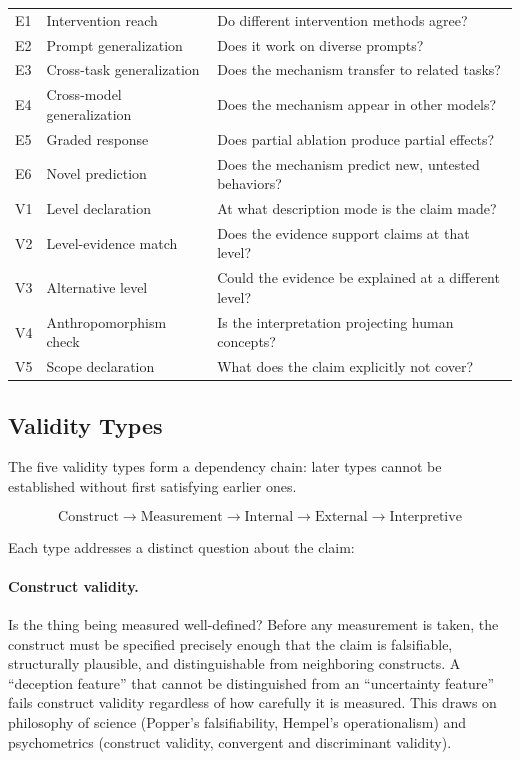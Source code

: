 \documentclass[10pt]{article}
\begin{document}
\begin{table}[H]
\begin{tabular}{@{}llp{8.5cm}@{}}
\midrule
E1 & Intervention reach & Do different intervention methods agree? \\
E2 & Prompt generalization & Does it work on diverse prompts? \\
E3 & Cross-task generalization & Does the mechanism transfer to related tasks? \\
E4 & Cross-model generalization & Does the mechanism appear in other models? \\
E5 & Graded response & Does partial ablation produce partial effects? \\
E6 & Novel prediction & Does the mechanism predict new, untested behaviors? \\
\midrule
V1 & Level declaration & At what description mode is the claim made? \\
V2 & Level-evidence match & Does the evidence support claims at that level? \\
V3 & Alternative level & Could the evidence be explained at a different level? \\
V4 & Anthropomorphism check & Is the interpretation projecting human concepts? \\
V5 & Scope declaration & What does the claim explicitly not cover? \\
\bottomrule
\end{tabular}
\end{table}
\endgroup

\subsection{Validity Types}
\label{sec:validity-types}

The five validity types form a dependency chain: later types cannot be established without first satisfying earlier ones.

\begin{equation}
\text{Construct} \rightarrow \text{Measurement} \rightarrow \text{Internal} \rightarrow \text{External} \rightarrow \text{Interpretive}
\label{eq:dependency}
\end{equation}

Each type addresses a distinct question about the claim:

\paragraph{Construct validity.} Is the thing being measured well-defined? Before any measurement is taken, the construct must be specified precisely enough that the claim is falsifiable, structurally plausible, and distinguishable from neighboring constructs. A ``deception feature'' that cannot be distinguished from an ``uncertainty feature'' fails construct validity regardless of how carefully it is measured. This draws on philosophy of science (Popper's falsifiability, Hempel's operationalism) and psychometrics (construct validity, convergent and discriminant validity).
\end{document}
